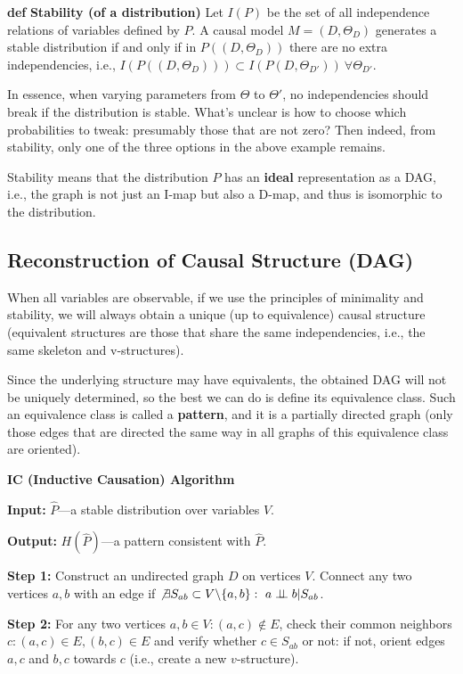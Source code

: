 \documentclass[fleqn]{article}
\newcommand{\independent}{\perp \!\!\! \perp}
\def\define#1{\textbf{def} \textbf{#1}}
\numberwithin{equation}{section}
\numberwithin{theorem}{section}
\numberwithin{figure}{section}
\numberwithin{lemma}{section}
\numberwithin{corollary}{section}
\begin{document}
\define{Stability (of a distribution)} Let $I(P)$ be the set of all independence relations of variables defined by $P$. A causal model $M = (D, \Theta_D)$ generates a stable distribution if and only if in $P((D, \Theta_D))$ there are no extra independencies, i.e., $I(P((D, \Theta_D))) \subset I(P(D, \Theta_{D'}))\ \forall \Theta_{D'}$.

In essence, when varying parameters from $\Theta$ to $\Theta'$, no independencies should break if the distribution is stable. What's unclear is how to choose which probabilities to tweak: presumably those that are not zero? Then indeed, from stability, only one of the three options in the above example remains.

Stability means that the distribution $P$ has an \textbf{ideal} representation as a DAG, i.e., the graph is not just an I-map but also a D-map, and thus is isomorphic to the distribution.

\subsection*{Reconstruction of Causal Structure (DAG)}

When all variables are observable, if we use the principles of minimality and stability, we will always obtain a unique (up to equivalence) causal structure (equivalent structures are those that share the same independencies, i.e., the same skeleton and v-structures).

Since the underlying structure may have equivalents, the obtained DAG will not be uniquely determined, so the best we can do is define its equivalence class. Such an equivalence class is called a \textbf{pattern}, and it is a partially directed graph (only those edges that are directed the same way in all graphs of this equivalence class are oriented).

\textbf{IC (Inductive Causation) Algorithm}

\textbf{Input:} $\hat P$—a stable distribution over variables $V$.

\textbf{Output:} $H(\hat P)$—a pattern consistent with $\hat P$.

\textbf{Step 1:} Construct an undirected graph $D$ on vertices $V$. Connect any two vertices $a, b$ with an edge if $\not \exists S_{ab} \subset V \backslash \{a,b\}:\ a \independent b | S_{ab}$.

\textbf{Step 2:} For any two vertices $a, b \in V: (a,c) \not \in E$, check their common neighbors $c: (a,c)\in E, (b,c) \in E$ and verify whether $c \in S_{ab}$ or not: if not, orient edges $a,c$ and $b,c$ towards $c$ (i.e., create a new $v$-structure).
\end{document}
